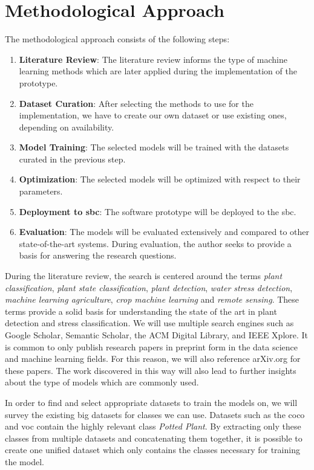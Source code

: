 \documentclass[draft,final]{vutinfth} %
\begin{document}
\section{Methodological Approach}
\label{sec:methods}

The methodological approach consists of the following steps:

\begin{enumerate}
\item \textbf{Literature Review}: The literature review informs the
  type of machine learning methods which are later applied during the
  implementation of the prototype.
\item \textbf{Dataset Curation}: After selecting the methods to use
  for the implementation, we have to create our own dataset or use
  existing ones, depending on availability.
\item \textbf{Model Training}: The selected models will be trained
  with the datasets curated in the previous step.
\item \textbf{Optimization}: The selected models will be optimized
  with respect to their parameters.
\item \textbf{Deployment to \gls{sbc}}: The software prototype will be
  deployed to the \gls{sbc}.
\item \textbf{Evaluation}: The models will be evaluated extensively
  and compared to other state-of-the-art systems. During evaluation,
  the author seeks to provide a basis for answering the research
  questions.
\end{enumerate}

During the literature review, the search is centered around the terms
\emph{plant classification}, \emph{plant state classification},
\emph{plant detection}, \emph{water stress detection}, \emph{machine
learning agriculture}, \emph{crop machine learning} and \emph{remote
sensing}. These terms provide a solid basis for understanding the
state of the art in plant detection and stress classification. We will
use multiple search engines such as Google Scholar, Semantic Scholar,
the ACM Digital Library, and IEEE Xplore. It is common to only publish
research papers in preprint form in the data science and machine
learning fields. For this reason, we will also reference arXiv.org for
these papers. The work discovered in this way will also lead to
further insights about the type of models which are commonly used.

In order to find and select appropriate datasets to train the models
on, we will survey the existing big datasets for classes we can
use. Datasets such as the \gls{coco} \cite{lin2015} and
\gls{voc} \cite{everingham2010} contain the highly relevant class
\emph{Potted Plant}. By extracting only these classes from multiple
datasets and concatenating them together, it is possible to create one
unified dataset which only contains the classes necessary for training
the model.
\end{document}
